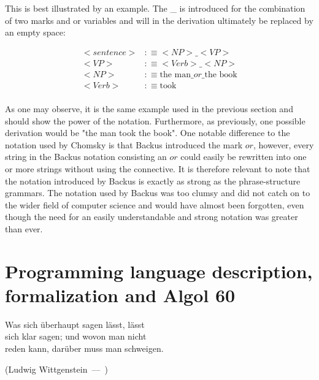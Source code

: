 \documentclass{article}
\let\oldquote\quote
\let\endoldquote\endquote
\renewenvironment{quote}[2][]
{\if\relax\detokenize{#1}\relax
	\def\quoteauthor{#2}%
	\else
	\def\quoteauthor{#2~---~#1}%
	\fi
	\oldquote}
{\par\nobreak\smallskip\hfill(\quoteauthor)%
	\endoldquote\addvspace{\bigskipamount}}
\begin{document}
This is best illustrated by an example. The \_ is introduced for the combination of two marks and\/ or variables and will in the derivation ultimately be replaced by an empty space:

\begin{equation} \label{eq2}
	\begin{split}
		<sentence> &:\equiv<NP>\_<VP> \\
		<VP> &:\equiv<Verb>\_<NP > \\
		<NP> &:\equiv\text{the man}\_or\_\text{the book} \\
		<Verb> &:\equiv\text{took} \\
	\end{split}
\end{equation}

As one may observe, it is the same example used in the previous section and should show the power of the notation. Furthermore, as previously, one possible derivation would be "the man took the book". One notable difference to the notation used by Chomsky is that Backus introduced the mark $or$, however, every string in the Backus notation consisting an $or$ could easily be rewritten into one or more strings without using the connective. It is therefore relevant to note that the notation introduced by Backus is exactly as strong as the phrase-structure grammars. The notation used by Backus was too clumsy and did not catch on to the wider field of computer science and would have almost been forgotten, even though the need for an easily understandable and strong notation was greater than ever.

\section{Programming language description, formalization and Algol 60}

\begin{quote}{Ludwig Wittgenstein}
	\begin{flushright}
		Was sich überhaupt sagen lässt, lässt \\ sich klar sagen; und wovon man nicht \\ reden kann, darüber muss man schweigen.
	\end{flushright}
\end{quote}
\end{document}
